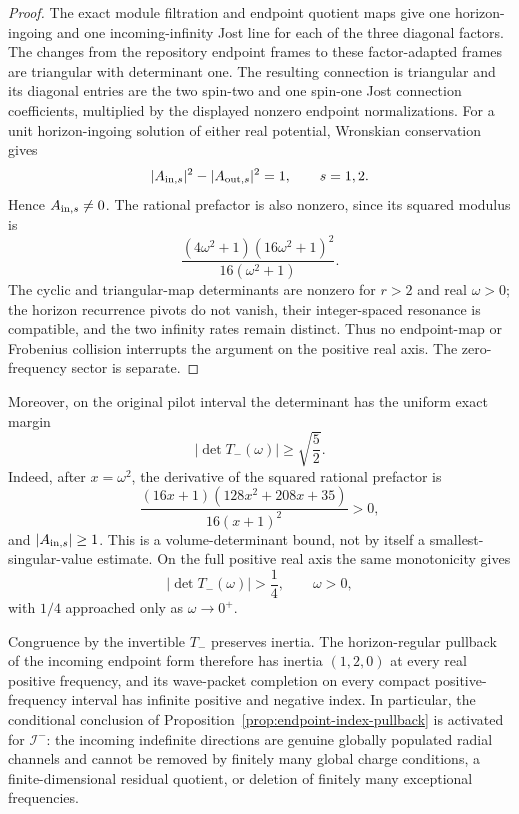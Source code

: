 \documentclass[11pt]{article}
\theoremstyle{definition}
\theoremstyle{remark}
\begin{document}
\begin{proof}
The exact module filtration and endpoint quotient maps give one
horizon-ingoing and one incoming-infinity Jost line for each of the three
diagonal factors.  The changes from the repository endpoint frames to these
factor-adapted frames are triangular with determinant one.  The resulting
connection is triangular and its diagonal entries are the two spin-two and
one spin-one Jost connection coefficients, multiplied by the displayed
nonzero endpoint normalizations.  For a unit horizon-ingoing solution of
either real potential, Wronskian conservation gives
\[
 |A_{{\rm in},s}|^2-|A_{{\rm out},s}|^2=1,
 \qquad s=1,2.
\]
Hence \(A_{{\rm in},s}\neq0\).  The rational prefactor is also nonzero,
since its squared modulus is
\[
 \frac{(4\omega^2+1)(16\omega^2+1)^2}
 {16(\omega^2+1)}.
\]
The cyclic and triangular-map determinants are nonzero for \(r>2\) and
real \(\omega>0\); the horizon recurrence pivots do not vanish, their
integer-spaced resonance is compatible, and the two infinity rates remain
distinct.  Thus no endpoint-map or Frobenius collision interrupts the
argument on the positive real axis.  The zero-frequency sector is separate.
\end{proof}

Moreover, on the original pilot interval the determinant has the uniform
exact margin
\[
 \left|\det T_-(\omega)\right|\geq\sqrt{\frac52}.
\]
Indeed, after \(x=\omega^2\), the derivative of the squared rational
prefactor is
\[
 \frac{(16x+1)(128x^2+208x+35)}{16(x+1)^2}>0,
\]
and \(\lvert A_{{\rm in},s}\rvert\geq1\).  This is a volume-determinant
bound, not by itself a smallest-singular-value estimate.
On the full positive real axis the same monotonicity gives
\[
 \left|\det T_-(\omega)\right|>\frac14,\qquad \omega>0,
\]
with \(1/4\) approached only as \(\omega\to0^+\).

Congruence by the invertible \(T_-\) preserves inertia.  The
horizon-regular pullback of the incoming endpoint form therefore has
inertia \((1,2,0)\) at every real positive frequency, and its wave-packet
completion on every compact positive-frequency interval has infinite
positive and negative index.  In particular, the conditional
conclusion of Proposition~\ref{prop:endpoint-index-pullback} is activated
for \(\mathscr I^-\): the incoming indefinite directions are genuine
globally populated radial channels and cannot be removed by finitely many
global charge conditions, a finite-dimensional residual quotient, or
deletion of finitely many exceptional frequencies.
\end{document}
